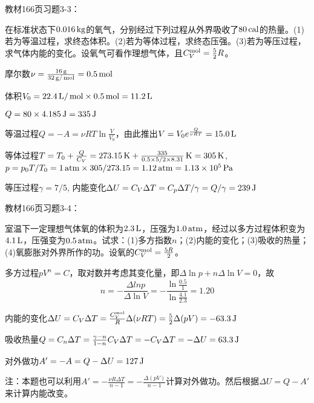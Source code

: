 \documentclass[CJK]{beamer}
\begin{document}
\begin{frame}
  \chtitle{\proid   (\stwo)}
  \bch
  教材166页习题3-3：

  
  在标准状态下$0.016\,\mathrm{kg}$的氧气，分别经过下列过程从外界吸收了$80\,\mathrm{cal}$的热量。(1)若为等温过程，求终态体积。(2)若为等体过程，求终态压强。(3)若为等压过程，求气体内能的变化。设氧气可看作理想气体，且$C_V^{\rm mol} = \frac{5}{2}R$。
  \ech
\end{frame}

\begin{frame}
  \bch
  摩尔数$\nu = \frac{16\,\mathrm{g}}{32\,\mathrm{g}/\,\mathrm{mol}} = 0.5\,\mathrm{mol}$
  
  体积$V_0 = 22.4\,\mathrm{L}/\,\mathrm{mol} \times 0.5\,\mathrm{mol} = 11.2\,\mathrm{L}$

  $Q = 80\times 4.185 \,\mathrm{J} = 335\,\mathrm{J}$
  \bitem
\item{等温过程$Q = -A = \nu RT \ln\frac{V}{V_0}$，由此推出$V = V_0e^{\frac{Q}{\nu RT}} = 15.0\,\mathrm{L}$}
\item{等体过程$T = T_0+ \frac{Q}{C_V} = 273.15\,\mathrm{K} + \frac{335}{0.5\times 5/2\times 8.31}\,\mathrm{K} = 305\,\mathrm{K}$, $p = p_0 T/T_0 = 1\,\mathrm{atm} \times 305/273.15 = 1.12 \,\mathrm{atm} = 1.13\times 10^5\,\mathrm{Pa}$}
\item{等压过程$\gamma = 7/5$, 内能变化$\Delta U = C_V\Delta T = C_p\Delta T /\gamma = Q/\gamma = 239\,\mathrm{J}$}
  \eitem
  
  \ech
\end{frame}

\begin{frame}
  \chtitle{\proid (\stwo)}
  \bch
  教材166页习题3-4：

  室温下一定理想气体氧的体积为$2.3\,\mathrm{L}$，压强为$1.0\,\mathrm{atm}$，经过以多方过程体积变为$4.1\,\mathrm{L}$，压强变为$0.5\,\mathrm{atm}$。试求：(1)多方指数$n$；(2)内能的变化；(3)吸收的热量；(4)氧膨胀对外界所作的功。设氧的$C_V^{\rm mol}=\frac{5R}{2}$。
  \ech
\end{frame}

\begin{frame}
  \bch
      {\small
        \bitem
      \item{
        多方过程$pV^n = C$，取对数并考虑其变化量，即$\Delta \ln p + n \Delta \ln V = 0$，故
        $$n = - \frac{\Delta ln p}{\Delta \ln V} = -\frac{\ln\frac{0.5}{1}}{\ln\frac{4.1}{2.3}} = 1.20 $$}
      \item{内能的变化$\Delta U  = C_V\Delta T = \frac{C_V^{\rm mol}}{R}\Delta (\nu RT) = \frac{5}{2}\Delta(pV) = -63.3\,\mathrm{J}$}
      \item{吸收热量$Q = C_n \Delta T = \frac{\gamma-n}{1-n}C_V\Delta T = -C_V\Delta T = -\Delta U = 63.3\,\mathrm{J}$}
      \item{对外做功$A'=-A = Q-\Delta U = 127\,\mathrm{J}$}
        \eitem
        \skipline
        
注：本题也可以利用$A' = -\frac{\nu R \Delta T}{n-1} =-\frac{\Delta(pV)}{n-1}$计算对外做功。然后根据$\Delta U = Q-A'$来计算内能改变。        
  }
  \ech
\end{frame}
\end{document}
